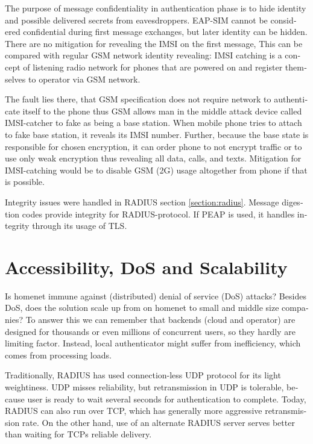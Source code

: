 \documentclass[12pt,a4paper,english]{tutthesis}
\begin{document}
\begin{otherlanguage}{english}
The purpose of message confidentiality in authentication phase is
to hide identity and possible delivered secrets from
eavesdroppers. EAP-SIM cannot be considered confidential during 
first message exchanges, but later identity can be hidden.
There are no mitigation for revealing the IMSI on the first message,
This can be compared with regular GSM network identity revealing: IMSI
catching is a concept of listening radio network for phones that are
powered on and register themselves to operator via GSM network.  

The
fault lies there, that GSM specification does not require network to
authenticate itself to the phone thus GSM allows man in the middle
attack device called IMSI-catcher to fake as being a base station.
When mobile phone tries to attach to fake base station, it reveals its
IMSI number. Further, because the base state is responsible for chosen
encryption, it can order phone to not encrypt traffic or to use only
weak encryption thus revealing all data, calls, and
texts\cite{imsi-heise}. Mitigation for IMSI-catching would be to
disable GSM (2G) usage altogether from phone if that is possible.




Integrity issues were handled in RADIUS section \ref{section:radius}.
Message digestion codes provide integrity for RADIUS-protocol.
If PEAP is used, it handles integrity through its usage of TLS\cite{peap}.

\section{Accessibility, DoS and Scalability}
\label{sec-6-6}
Is homenet immune against (distributed) denial of service (DoS)
attacks? Besides DoS, does the solution scale up from on homenet to
small and middle size companies?
To answer this we can remember that backends (cloud and operator) are
designed for thousands or even millions of concurrent users, so 
they hardly are limiting factor. Instead, local
authenticator might suffer from inefficiency, which
comes from processing loads\cite{2009-lin-simefficiency}.


Traditionally, RADIUS has used connection-less UDP protocol for its
light weightiness. UDP misses reliability, but retransmission in UDP is
tolerable, because user is ready to wait several seconds for
authentication to complete. Today, RADIUS can also run over TCP, which
has generally more aggressive retransmission
rate\cite[2.2.1]{rfc5080}. On the other hand, use of an alternate
RADIUS server serves better than waiting for TCPs reliable delivery.




\end{otherlanguage}
\end{document}
